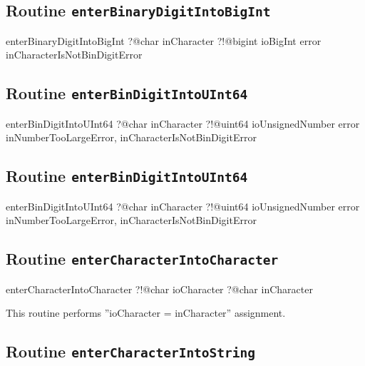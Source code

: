 \subsection{Routine \texttt{enterBinaryDigitIntoBigInt}}

\begin{galgas3}
enterBinaryDigitIntoBigInt ?@char inCharacter
                           ?!@bigint ioBigInt
                           error inCharacterIsNotBinDigitError
\end{galgas3}

\subsection{Routine \texttt{enterBinDigitIntoUInt64}}

\begin{galgas3}
enterBinDigitIntoUInt64 ?@char inCharacter
                        ?!@uint64 ioUnsignedNumber
                        error inNumberTooLargeError,
                              inCharacterIsNotBinDigitError
\end{galgas3}

\subsection{Routine \texttt{enterBinDigitIntoUInt64}}

\begin{galgas3}
enterBinDigitIntoUInt64 ?@char inCharacter
                        ?!@uint64 ioUnsignedNumber
                        error inNumberTooLargeError,
                              inCharacterIsNotBinDigitError
\end{galgas3}

\subsection{Routine \texttt{enterCharacterIntoCharacter}}

\begin{galgas3}
enterCharacterIntoCharacter ?!@char ioCharacter
                            ?@char inCharacter
\end{galgas3}

This routine performs ''ioCharacter = inCharacter'' assignment.

\subsection{Routine \texttt{enterCharacterIntoString}}

